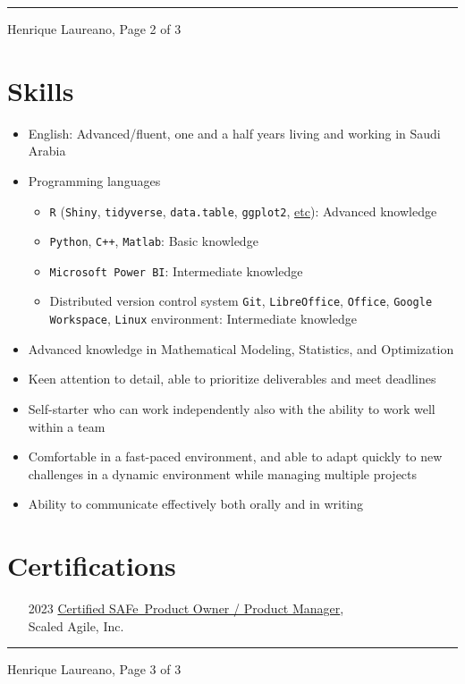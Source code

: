 \documentclass[12pt]{article}
\newcommand{\horrule}[1]{\noindent\rule{\linewidth}{#1}}
\begin{document}
\vspace{\fill}
\horrule{1pt}
\noindent Henrique Laureano, \hfill Page 2 of 3

\section*{Skills}

\begin{itemize}
 \item English: Advanced/fluent, one and a half years living and working
       in Saudi Arabia
 \item Programming languages
  \begin{itemize}
   \item \texttt{R} (\texttt{Shiny}, \texttt{tidyverse},
     \texttt{data.table}, \texttt{ggplot2},
     \href{https://henriquelaureano.github.io/visualizations/}{\color{blue}etc}):
         Advanced knowledge
   \item \texttt{Python}, \texttt{C++}, \texttt{Matlab}: Basic knowledge
   \item \texttt{Microsoft Power BI}: Intermediate knowledge 
   \item Distributed version control system \texttt{Git},
         \texttt{LibreOffice}, \texttt{Office},
         \texttt{Google Workspace}, \texttt{Linux} environment:
         Intermediate knowledge
  \end{itemize}
 \item Advanced knowledge in Mathematical Modeling, Statistics, and
       Optimization
 \item Keen attention to detail, able to prioritize deliverables and meet deadlines
 \item Self-starter who can work independently also with the ability to work well
       within a team
 \item Comfortable in a fast-paced environment, and able to adapt quickly to new
       challenges in a dynamic environment while managing multiple projects
 \item Ability to communicate effectively both orally and in writing
\end{itemize}

\section*{Certifications}

\begin{itemize}
 \item[2023] \href{https://www.credly.com/badges/14777d32-2f4f-43b9-bbff-4f414779f485/linked_in?t=rxek5i}{\color{blue}Certified SAFe\textregistered~Product Owner / Product Manager},\\
             Scaled Agile, Inc.
\end{itemize}

\vspace{\fill}
\horrule{1pt}
\noindent Henrique Laureano, \hfill Page 3 of 3
\end{document}
